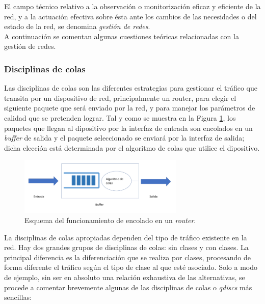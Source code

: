 El campo técnico relativo a la observación o monitorización eficaz y eficiente de la red, y a la actuación efectiva sobre ésta ante los cambios de las necesidades o del estado de la red, se denomina \textit{gestión de redes}.\\

A continuación se comentan algunas cuestiones teóricas relacionadas con la gestión de redes.
	
	\subsubsection{Disciplinas de colas}
Las disciplinas de colas son las diferentes estrategias para gestionar el tráfico que transita por un dispositivo de red, principalmente un router, para elegir el siguiente paquete que será enviado por la red, y para manejar los parámetros de calidad que se pretenden lograr. Tal y como se muestra en la Figura \ref{teoriaColas}, los paquetes que llegan al dipositivo por la interfaz de entrada son encolados en un \textit{buffer} de salida y el paquete seleccionado se enviará por la interfaz de salida; dicha elección está determinada por el algoritmo de colas que utilice el dipositivo.
	
	\begin{figure}[H]
			\centering
			\includegraphics[width=0.7\textwidth]{img/teoriaColas.PNG}
			\caption{Esquema del funcionamiento de encolado en un \textit{router}.}
			\label{teoriaColas}
		\end{figure}
		
	La disciplinas de colas apropiadas dependen del tipo de tráfico existente en la red. Hay dos grandes grupos de disciplinas de colas: sin clases y con clases. La principal diferencia es la diferenciación que se realiza por clases, procesando de forma diferente el tráfico según el tipo de clase al que esté asociado. Solo a modo de ejemplo, sin ser en absoluto una relación exhaustiva de las alternativas, se procede a comentar brevemente algunas de las disciplinas de colas o \textit{qdiscs} más sencillas:
	
